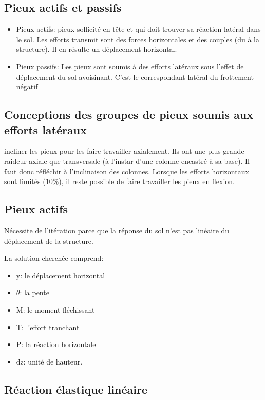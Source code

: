 \subsection{Pieux actifs et passifs}

\begin{itemize}
    \item Pieux actifs: pieux sollicité en tête et qui doit trouver sa réaction latéral dans le sol. Les efforts transmit sont des forces horizontales et des couples (du à la structure). Il en résulte un déplacement horizontal.
    \item Pieux passifs: Les pieux sont soumis à des efforts latéraux sous l'effet de déplacement du sol avoisinant. C'est le correspondant latéral du frottement négatif
\end{itemize}

\subsection{Conceptions des groupes de pieux soumis aux efforts latéraux}

incliner les pieux pour les faire travailler axialement. Ils ont une plus grande raideur axiale que transversale (à l'instar d'une colonne encastré à sa base). Il faut donc réfléchir à l'inclinaison des colonnes. Lorsque les efforts horizontaux sont limités (10\%), il reste possible de faire travailler les pieux en flexion.

\subsection{Pieux actifs}

Nécessite de l'itération parce que la réponse du sol n'est pas linéaire du déplacement de la structure.

La solution cherchée comprend:
\begin{itemize}
    \item y: le déplacement horizontal
    \item $\theta$: la pente
    \item M: le moment fléchissant
    \item T: l'effort tranchant
    \item P: la réaction horizontale
    \item dz: unité de hauteur.
\end{itemize}

\subsection{Réaction élastique linéaire}

